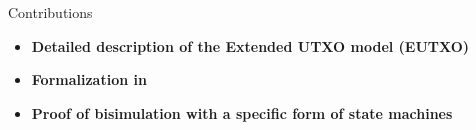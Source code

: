 \begin{frame}[label=contributions]{Contributions}

\begin{itemize}
\setlength\itemsep{.25cm}

\item \textbf{Detailed description of the Extended UTXO model (EUTXO)}
\begin{center}
\scalebox{.7}{
  \begin{tikzpicture}
    \eutxo
  \end{tikzpicture}
}
\end{center}

\item \textbf{Formalization in} \\

\item \textbf{Proof of bisimulation with a specific form of state machines}\\
\begin{center}
\scalebox{.6}{
  \begin{tikzpicture}
    \multisig
  \end{tikzpicture}
}
\end{center}

\end{itemize}

\end{frame}
